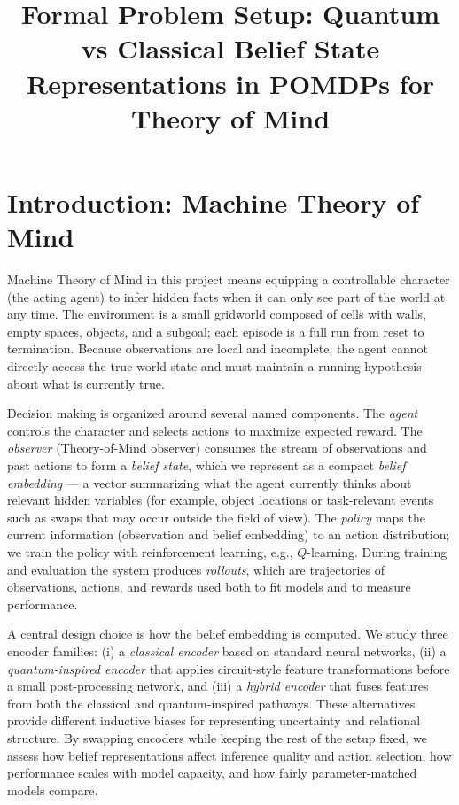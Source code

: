 \documentclass[11pt]{article}
\title{Formal Problem Setup: Quantum vs Classical Belief State Representations in POMDPs for Theory of Mind}
\author{}
\date{}
\begin{document}
\maketitle

\section{Introduction: Machine Theory of Mind}

Machine Theory of Mind in this project means equipping a controllable character (the acting agent) to infer hidden facts when it can only see part of the world at any time. The environment is a small gridworld composed of cells with walls, empty spaces, objects, and a subgoal; each episode is a full run from reset to termination. Because observations are local and incomplete, the agent cannot directly access the true world state and must maintain a running hypothesis about what is currently true.

Decision making is organized around several named components. The \emph{agent} controls the character and selects actions to maximize expected reward. The \emph{observer} (Theory-of-Mind observer) consumes the stream of observations and past actions to form a \emph{belief state}, which we represent as a compact \emph{belief embedding} — a vector summarizing what the agent currently thinks about relevant hidden variables (for example, object locations or task-relevant events such as swaps that may occur outside the field of view). The \emph{policy} maps the current information (observation and belief embedding) to an action distribution; we train the policy with reinforcement learning, e.g., \(Q\)-learning. During training and evaluation the system produces \emph{rollouts}, which are trajectories of observations, actions, and rewards used both to fit models and to measure performance.

A central design choice is how the belief embedding is computed. We study three encoder families: (i) a \emph{classical encoder} based on standard neural networks, (ii) a \emph{quantum-inspired encoder} that applies circuit-style feature transformations before a small post-processing network, and (iii) a \emph{hybrid encoder} that fuses features from both the classical and quantum-inspired pathways. These alternatives provide different inductive biases for representing uncertainty and relational structure. By swapping encoders while keeping the rest of the setup fixed, we assess how belief representations affect inference quality and action selection, how performance scales with model capacity, and how fairly parameter-matched models compare.
\end{document}
